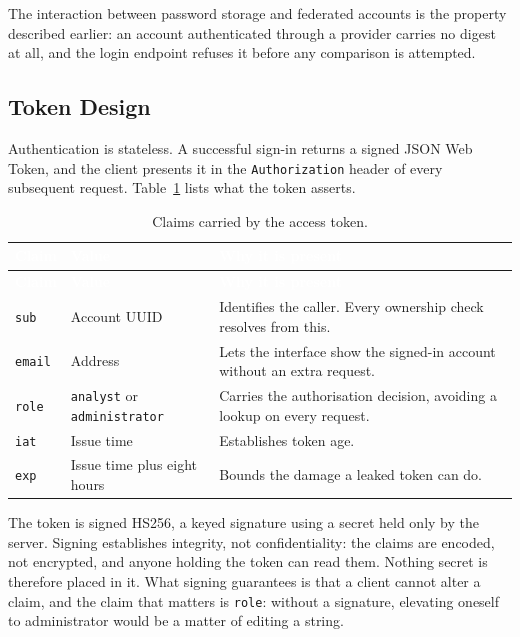 The interaction between password storage and federated accounts is the property described
earlier: an account authenticated through a provider carries no digest at all, and the login
endpoint refuses it before any comparison is attempted.

\subsection{Token Design}

Authentication is stateless. A successful sign-in returns a signed JSON Web
Token\citep{rfc7519}, and the client presents it in the \texttt{Authorization} header of
every subsequent request. Table~\ref{tab:jwtclaims} lists what the token asserts.

\begin{longtable}{|p{}|p{}|p{}|}
\caption{Claims carried by the access token.}\label{tab:jwtclaims}\\
\hline
\rowcolor{myblue}\textcolor{white}{\textbf{Claim}} & \textcolor{white}{\textbf{Value}} & \textcolor{white}{\textbf{Why it is present}} \\
\hline
\endfirsthead
\hline
\rowcolor{myblue}\textcolor{white}{\textbf{Claim}} & \textcolor{white}{\textbf{Value}} & \textcolor{white}{\textbf{Why it is present}} \\
\hline
\endhead
\texttt{sub} & Account UUID & Identifies the caller. Every ownership check resolves from this. \\ \hline
\texttt{email} & Address & Lets the interface show the signed-in account without an extra request. \\ \hline
\texttt{role} & \texttt{analyst} or \texttt{administrator} & Carries the authorisation decision, avoiding a lookup on every request. \\ \hline
\texttt{iat} & Issue time & Establishes token age. \\ \hline
\texttt{exp} & Issue time plus eight hours & Bounds the damage a leaked token can do. \\ \hline
\end{longtable}

The token is signed HS256\citep{rfc7515}, a keyed signature using a secret held only by the
server. Signing establishes integrity, not confidentiality: the claims are encoded, not
encrypted, and anyone holding the token can read them. Nothing secret is therefore placed in
it. What signing guarantees is that a client cannot alter a claim, and the claim that matters
is \texttt{role}: without a signature, elevating oneself to administrator would be a matter
of editing a string.

